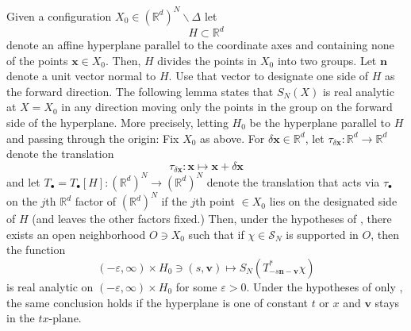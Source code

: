\documentclass[11pt, letterpaper, reqno]{amsart}
\theoremstyle{definition}
\newenvironment{lemma}
{\pushQED{\qed}\renewcommand{\qedsymbol}{$\blacksquare$}\lemmax}
{\popQED\endlemmax}
\theoremstyle{remark}
\newcommand{\bbR}{\mathbb{R}}
\newcommand{\calS}{\mathcal{S}}
\newcommand{\bfn}{\mathbf{n}}
\newcommand{\bfv}{\mathbf{v}}
\newcommand{\bfx}{\mathbf{x}}
\begin{document}
 
Given a configuration $X_0\in (\bbR^d)^N\backslash \Delta $ let
\begin{equation} 
   H \subset \bbR^d 
\end{equation} 
denote an affine hyperplane parallel to the coordinate axes and containing none of the points $\bfx\in X_0$. Then, $H$ divides the points in $X_0$ into two groups. Let $\bfn$ denote a unit vector normal to $H$. Use that vector to designate one side of $H$ as the forward direction.
The following lemma states that $S_N(X)$ is real analytic at $X=X_0$ in any direction moving only the points in the group on the forward side of the hyperplane. More precisely, letting $H_0$ be the hyperplane parallel to $H$ and passing through the origin:
\begin{lemma}\label{lem:reduction} 
Fix $X_0$ as above. 
For $\delta \bfx\in \bbR^d$, let $\tau_{\delta \bfx}:\bbR^d\to \bbR^d$ denote the translation 
\begin{equation} 
    \tau_{\delta \bfx} :\bfx \mapsto \bfx+\delta \bfx 
\end{equation} 
and let $T_{\bullet}=T_\bullet[H]:(\bbR^d)^N\to (\bbR^d)^N$ denote the translation that acts via $\tau_{\bullet}$ on the $j$th $\bbR^d$ factor of $(\bbR^d)^N$ if the $j$th point $\in X_0$ lies on the designated side of $H$ (and leaves the other factors fixed.) Then, under the hypotheses of ,  there exists an open neighborhood $O\ni X_0$ such that if $\chi\in \calS_N$ is supported in $O$, then the function 
\begin{equation}
    (-\varepsilon,\infty) \times H_0\ni (s, \bfv) \mapsto S_N(T^*_{-s \bfn - \bfv } \chi)
\end{equation}
is real analytic on $(-\varepsilon, \infty)\times H_0$ for some $\varepsilon>0$. 
Under the hypotheses of only , the same conclusion holds if the hyperplane is one of constant $t$ or $x$ and $\bfv$ stays in the $tx$-plane. 
\end{lemma}
\end{document}
